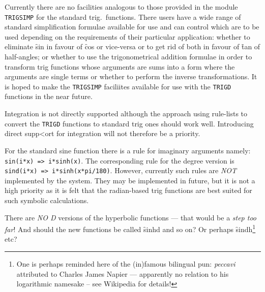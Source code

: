 Currently  there are no facilities analogous to those provided in the module \texttt{TRIGSIMP} for the standard trig.\ functions.  There users have a wide range of  standard simplification formulae available for use and can control which are to be used depending on the  requirements of their particular application: whether to eliminate
 \f{sin} in favour of \f{cos} or vice-versa or to get rid of both in favour of \f{tan} of half-angles; or whether to use the trigonometrical addition formulae in order to transform  trig functions whose arguments are sums into a form where the arguments are single terms or whether to perform the inverse transformations.  It is hoped to make the \texttt{TRIGSIMP}  faciliites available for use with the \texttt{TRIGD} functions in the near future.

Integration is not directly supported although the approach using rule-lists to convert the \texttt{TRIGD} functions  to standard trig ones should work well.  Introducing direct supp<ort for integration will not therefore be a priority. 

 For the standard sine function there is a rule for imaginary arguments namely: \texttt{sin(i*x) => i*sinh(x)}. The corresponding rule for the degree version is \texttt{sind(i*x) => i*sinh(x*pi/180)}.  However, currently such rules are \emph{NOT} implemented by the system.  They may be implemented in future, but it is not a high priority as it is felt that the radian-based trig functions are best suited  for such symbolic calculations.

There are \emph{NO D} versions of the hyperbolic functions  --- that would be a \textit{step too far}!  And should the new functions be called \f{sinhd} and so on? Or perhaps \f{sindh}\footnote{One is perhaps reminded here of the (in)famous bilingual pun: \emph{peccavi} attributed to Charles James Napier ---  apparently no relation to his logarithmic namesake -- see Wikipedia for details!} etc?

